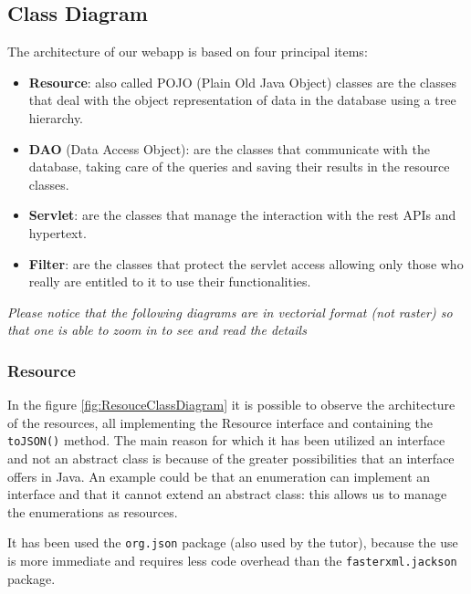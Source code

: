 \subsection{Class Diagram}

The architecture of our webapp is based on four principal items:
\begin{itemize}
    \item \textbf{Resource}: also called POJO (Plain Old Java Object) classes are the classes that deal with the object representation of data in the database using a tree hierarchy.
    \item \textbf{DAO} (Data Access Object): are the classes that communicate with the database, taking care of the queries and saving their results in the resource classes.
    \item \textbf{Servlet}: are the classes that manage the interaction with the rest APIs and hypertext.
    \item \textbf{Filter}: are the classes that protect the servlet access allowing only those who really are entitled to it to use their functionalities.
\end{itemize}

\textit{Please notice that the following diagrams are in vectorial format (not raster) so that one is able to zoom in to see and read the details}

\subsubsection*{Resource}

In the figure \ref{fig:ResouceClassDiagram} it is possible to observe the 
architecture of the resources, all implementing the Resource interface
and containing the \texttt{toJSON()} method.
The main reason for which it has been utilized an interface and not an abstract
class is because of the greater possibilities that an interface offers in
Java. An example could be that an enumeration can implement an interface and that it cannot
extend an abstract class: this allows us to manage the enumerations
as resources.

It has been used the \texttt{org.json} package (also used by the tutor), because the
use is more  immediate and requires less code overhead than the
\texttt{fasterxml.jackson} package.


